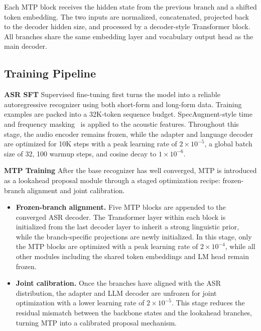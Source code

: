 Each MTP block receives the hidden state from the previous branch and a shifted token embedding. The two inputs are normalized, concatenated, projected back to the decoder hidden size, and processed by a decoder-style Transformer block. All branches share the same embedding layer and vocabulary output head as the main decoder. %

\subsection{Training Pipeline}

\textbf{ASR SFT} Supervised fine-tuning first turns the model into a reliable autoregressive recognizer using both short-form and long-form data. Training examples are packed into a 32K-token sequence budget. SpecAugment-style time and frequency masking~\citep{park2019specaugment} is applied to the acoustic features. Throughout this stage, the audio encoder remains frozen, while the adapter and language decoder are optimized for 10K steps with a peak learning rate of $2\times10^{-5}$, a global batch size of 32, 100 warmup steps, and cosine decay to $1\times10^{-6}$.

\textbf{MTP Training} After the base recognizer has well converged, MTP is introduced as a lookahead proposal module through a staged optimization recipe: frozen-branch alignment and joint calibration. 

\begin{itemize}
    \item \textbf{Frozen-branch alignment.} Five MTP blocks are appended to the converged ASR decoder. The Transformer layer within each block is initialized from the last decoder layer to inherit a strong linguistic prior, while the branch-specific projections are newly initialized. In this stage, only the MTP blocks are optimized with a peak learning rate of $2\times10^{-4}$, while all other modules including the shared token embeddings and LM head remain frozen. %
    \item \textbf{Joint calibration.} Once the branches have aligned with the ASR distribution, the adapter and LLM decoder are unfrozen for joint optimization with a lower learning rate of $2\times10^{-5}$. This stage reduces the residual mismatch between the backbone states and the lookahead branches, turning MTP into a calibrated proposal mechanism. %
\end{itemize}

